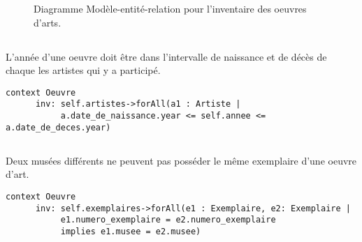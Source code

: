 \documentclass{article}
\begin{document}
  \begin{sidewaysfigure}
  \begin{adjustbox}{max size={\textwidth}{\textheight}}
  
  \end{adjustbox}
  \caption{Diagramme Modèle-entité-relation pour l'inventaire des oeuvres
  d'arts.}
  \end{sidewaysfigure}

  \subsection{}
  L'année d'une oeuvre doit être dans l'intervalle de naissance et de décès de
  chaque les artistes qui y a participé.

  \begin{lstlisting}[language=OCL]
  context Oeuvre
      inv: self.artistes->forAll(a1 : Artiste | 
           a.date_de_naissance.year <= self.annee <= a.date_de_deces.year)
  \end{lstlisting}

  \subsection{}
  Deux musées différents ne peuvent pas posséder le même exemplaire d'une oeuvre
  d'art.

  \begin{lstlisting}[language=OCL]
  context Oeuvre
      inv: self.exemplaires->forAll(e1 : Exemplaire, e2: Exemplaire | 
           e1.numero_exemplaire = e2.numero_exemplaire 
           implies e1.musee = e2.musee)
  \end{lstlisting}
\end{document}
